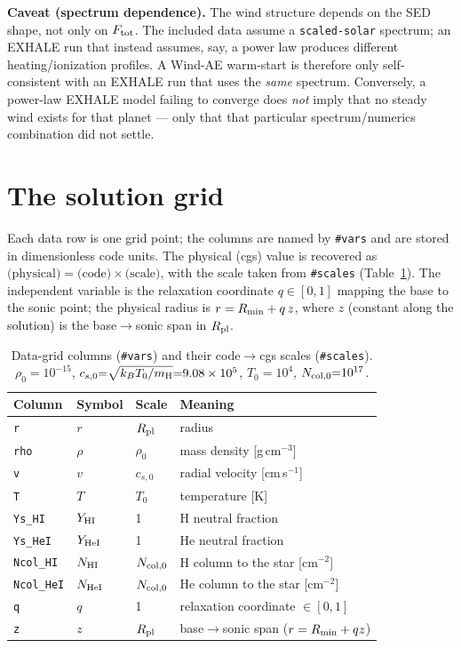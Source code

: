 \documentclass[english,a4paper]{my_memo}
\newcommand{\code}[1]{\texttt{#1}}
\newcommand{\Rp}{R_{\rm pl}}
\newcommand{\Ftot}{F_{\rm tot}}
\newcommand{\hd}[1]{\code{\##1}}      %
\begin{document}
\medskip\noindent\textbf{Caveat (spectrum dependence).} The wind structure
depends on the SED shape, not only on $\Ftot$. The included data assume a
\code{scaled-solar} spectrum; an EXHALE run that instead assumes, say, a
power law produces different heating/ionization profiles. A Wind-AE
warm-start is therefore only self-consistent with an EXHALE run that uses
the \emph{same} spectrum. Conversely, a power-law EXHALE model failing to
converge does \emph{not} imply that no steady wind exists for that planet
--- only that that particular spectrum/numerics combination did not settle.

\section{The solution grid}
\label{sec:grid}
Each data row is one grid point; the columns are named by \hd{vars} and are
stored in dimensionless code units. The physical (cgs) value is recovered
as $\text{(physical)} = \text{(code)}\times\text{(scale)}$, with the scale
taken from \hd{scales} (Table~\ref{tab:grid}). The independent variable is
the relaxation coordinate $q\in[0,1]$ mapping the base to the sonic point;
the physical radius is $r = R_{\rm min} + q\,z$, where $z$ (constant along
the solution) is the base$\to$sonic span in $\Rp$.

\begin{table}[t]\centering\small
\caption{Data-grid columns (\hd{vars}) and their code$\to$cgs scales
(\hd{scales}). $\rho_0{=}10^{-15}$, $c_{s,0}{=}\sqrt{k_BT_0/m_{\rm H}}
{=}9.08\times10^{5}$, $T_0{=}10^{4}$, $N_{\rm col,0}{=}10^{17}$.}
\label{tab:grid}
\begin{tabular}{@{}l l l p{6.0cm}@{}}
\toprule
Column & Symbol & Scale & Meaning \\
\midrule
\code{r}        & $r$            & $\Rp$              & radius \\
\code{rho}      & $\rho$         & $\rho_0$           & mass density [g\,cm$^{-3}$] \\
\code{v}        & $v$            & $c_{s,0}$          & radial velocity [cm\,s$^{-1}$] \\
\code{T}        & $T$            & $T_0$              & temperature [K] \\
\code{Ys\_HI}   & $Y_{\rm HI}$   & 1                  & H neutral fraction \\
\code{Ys\_HeI}  & $Y_{\rm HeI}$  & 1                  & He neutral fraction \\
\code{Ncol\_HI} & $N_{\rm HI}$   & $N_{\rm col,0}$    & H column to the star [cm$^{-2}$] \\
\code{Ncol\_HeI}& $N_{\rm HeI}$  & $N_{\rm col,0}$    & He column to the star [cm$^{-2}$] \\
\code{q}        & $q$            & 1                  & relaxation coordinate $\in[0,1]$ \\
\code{z}        & $z$            & $\Rp$              & base$\to$sonic span ($r=R_{\rm min}+qz$) \\
\bottomrule
\end{tabular}
\end{table}
\end{document}
